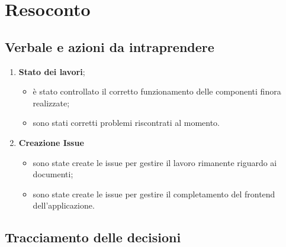 \section{Resoconto}
\subsection{Verbale e azioni da intraprendere}

\begin{enumerate}
	\item \textbf{Stato dei lavori};
	\begin{itemize}
		\item è stato controllato il corretto funzionamento delle componenti finora realizzate;
		\item sono stati corretti problemi riscontrati al momento.
	\end{itemize}
	\item \textbf{Creazione Issue}
	\begin{itemize}
		\item sono state create le issue  per gestire il lavoro rimanente riguardo ai documenti;
		\item sono state create le issue per gestire il completamento del frontend dell'applicazione.
	\end{itemize}
\end{enumerate}

\pagebreak

\subsection{Tracciamento delle decisioni}


